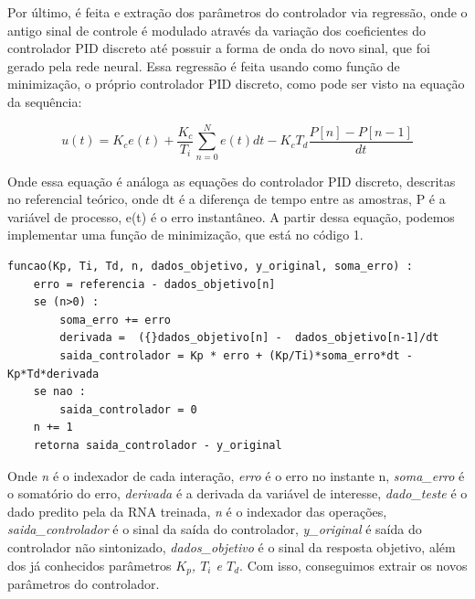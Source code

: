 Por último, é feita e extração dos parâmetros do controlador via regressão, onde o antigo sinal de controle é modulado através da variação dos coeficientes do controlador PID discreto até possuir a forma de onda do novo sinal, que foi gerado pela rede neural. Essa regressão é feita usando como função de minimização, o próprio controlador PID discreto, como pode ser visto na equação da sequência:

\begin{equation}\label{eq:motor_accel}
u(t) = K_c e(t) + \frac{K_c}{T_i}\sum_{n=0}^{N}{e(t)dt}-K_cT_d\frac{P[n]-P[n-1]}{dt}
\end{equation}

Onde essa equação é análoga as equações do controlador PID discreto, descritas no referencial teórico, onde dt é a diferença de tempo entre as amostras, P é a variável de processo, e(t) é o erro instantâneo. A partir dessa equação, podemos implementar uma função de minimização, que está no código 1.

\begin{lstlisting}[caption={Minimização da função do controlador PID}]
funcao(Kp, Ti, Td, n, dados_objetivo, y_original, soma_erro) :
    erro = referencia - dados_objetivo[n]
    se (n>0) :
        soma_erro += erro
        derivada =  ({}dados_objetivo[n] -  dados_objetivo[n-1]/dt
        saida_controlador = Kp * erro + (Kp/Ti)*soma_erro*dt - Kp*Td*derivada
    se nao :
        saida_controlador = 0
    n += 1
    retorna saida_controlador - y_original
\end{lstlisting}

Onde \textit{n} é o indexador de cada interação, \textit{erro} é o erro no instante n, \textit{soma\_erro} é o somatório do erro, \textit{derivada} é a derivada da variável de interesse, \textit{dado\_teste} é o dado predito pela da RNA treinada, \textit{n} é o indexador das operações, \textit{saida\_controlador} é o sinal da saída do controlador, \textit{y\_original} é saída do controlador não sintonizado, \textit{dados\_objetivo} é o sinal da resposta objetivo, além dos já conhecidos parâmetros \textit{$K_p$, $T_i$ e $T_d$}. Com isso, conseguimos extrair os novos parâmetros do controlador.
